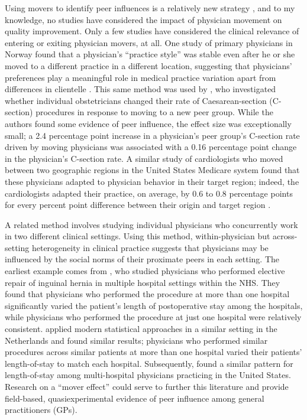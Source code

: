 \documentclass[12pt]{article}
\begin{document}
Using movers to identify peer influences is a relatively new strategy \citep{fernandezDoesCultureMatter2010}, and to my knowledge, no studies have considered the impact of physician movement on quality improvement. Only a few studies have considered the clinical relevance of entering or exiting physician movers, at all. One study of primary physicians in Norway found that a physician's ``practice style'' was stable even after he or she moved to a different practice in a different location, suggesting that physicians' preferences play a meaningful role in medical practice variation apart from differences in clientelle \citep{gryttenPracticeVariationPhysicianspecific2003}. This same method was used by \citet{epsteinFormationEvolutionPhysician2009}, who investigated whether individual obstetricians changed their rate of Caesarean-section (C-section) procedures in response to moving to a new peer group. While the authors found some evidence of peer influence, the effect size was exceptionally small; a 2.4 percentage point increase in a physician's peer group's C-section rate driven by moving physicians was associated with a 0.16 percentage point change in the physician's C-section rate. A similar study of cardiologists who moved between two geographic regions in the United States Medicare system found that these physicians adapted to physician behavior in their target region; indeed, the cardiologists adapted their practice, on average, by 0.6 to 0.8 percentage points for every percent point difference between their origin and target region \citep{molitorEvolutionPhysicianPractice2018}.

A related method involves studying individual physicians who concurrently work in two different clinical settings. Using this method, within-physician but across-setting heterogeneity in clinical practice suggests that physicians may be influenced by the social norms of their proximate peers in each setting. The earliest example comes from \citet{griffithsVariationHospitalStay1979}, who studied physicians who performed elective repair of inguinal hernia in multiple hospital settings within the NHS. They found that physicians who performed the procedure at more than one hospital significantly varied the patient's length of postoperative stay among the hospitals, while physicians who performed the procedure at just one hospital were relatively consistent. \citet{westertVariationDurationHospital1993} applied modern statistical approaches in a similar setting in the Netherlands and found similar results; physicians who performed similar procedures across similar patients at more than one hospital varied their patients' length-of-stay to match each hospital. Subsequently, \citet{jongVariationHospitalLength2006} found a similar pattern for length-of-stay among multi-hospital physicians practicing in the United States. Research on a ``mover effect'' could serve to further this literature and provide field-based, quasiexperimental evidence of peer influence among general practitioners (GPs).
\end{document}
